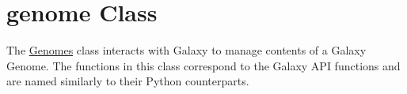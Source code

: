 \hypertarget{group__genomes__class}{}\section{genome Class}
\label{group__genomes__class}
The \hyperlink{classGenomes}{Genomes} class interacts with Galaxy to manage contents of a Galaxy Genome. The functions in this class correspond to the Galaxy A\+PI functions and are named similarly to their Python counterparts. 